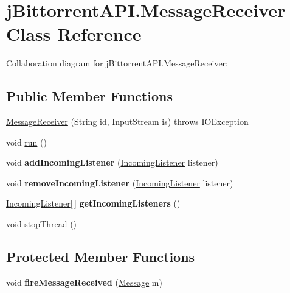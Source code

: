 \hypertarget{classj_bittorrent_a_p_i_1_1_message_receiver}{
\section{jBittorrentAPI.MessageReceiver Class Reference}
\label{classj_bittorrent_a_p_i_1_1_message_receiver}
}
Collaboration diagram for jBittorrentAPI.MessageReceiver:\subsection*{Public Member Functions}
\begin{DoxyCompactItemize}
\item 
\hyperlink{classj_bittorrent_a_p_i_1_1_message_receiver_ad6b379ea7fae866a042bcec60d443692}{MessageReceiver} (String id, InputStream is)  throws IOException 
\item 
void \hyperlink{classj_bittorrent_a_p_i_1_1_message_receiver_ac443b2bb4923cc0dc786624c2c8110be}{run} ()
\item 
\hypertarget{classj_bittorrent_a_p_i_1_1_message_receiver_a3083d3894f4e7a37e3af9e9b041f2de7}{
void {\bfseries addIncomingListener} (\hyperlink{interfacej_bittorrent_a_p_i_1_1_incoming_listener}{IncomingListener} listener)}
\label{classj_bittorrent_a_p_i_1_1_message_receiver_a3083d3894f4e7a37e3af9e9b041f2de7}

\item 
\hypertarget{classj_bittorrent_a_p_i_1_1_message_receiver_ac903c48a9ae33e5b7f1dd55530741767}{
void {\bfseries removeIncomingListener} (\hyperlink{interfacej_bittorrent_a_p_i_1_1_incoming_listener}{IncomingListener} listener)}
\label{classj_bittorrent_a_p_i_1_1_message_receiver_ac903c48a9ae33e5b7f1dd55530741767}

\item 
\hypertarget{classj_bittorrent_a_p_i_1_1_message_receiver_aeb50ee51a275eefa8008d39ffbc1eb7d}{
\hyperlink{interfacej_bittorrent_a_p_i_1_1_incoming_listener}{IncomingListener}\mbox{[}$\,$\mbox{]} {\bfseries getIncomingListeners} ()}
\label{classj_bittorrent_a_p_i_1_1_message_receiver_aeb50ee51a275eefa8008d39ffbc1eb7d}

\item 
void \hyperlink{classj_bittorrent_a_p_i_1_1_message_receiver_a88af317cab076caf36203622d169d95d}{stopThread} ()
\end{DoxyCompactItemize}
\subsection*{Protected Member Functions}
\begin{DoxyCompactItemize}
\item 
\hypertarget{classj_bittorrent_a_p_i_1_1_message_receiver_a9009d109e9044908640551bf6488143e}{
void {\bfseries fireMessageReceived} (\hyperlink{classj_bittorrent_a_p_i_1_1_message}{Message} m)}
\label{classj_bittorrent_a_p_i_1_1_message_receiver_a9009d109e9044908640551bf6488143e}

\end{DoxyCompactItemize}


